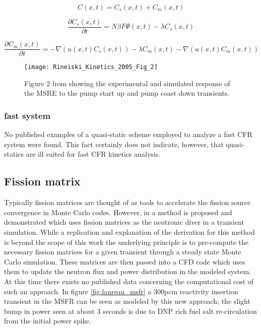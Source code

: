 \documentclass[review]{elsarticle}
\begin{document}
\begin{equation}
    \label{eq:spk_uni}
    C(x,t) = C_{s}(x,t) + C_{m}(x,t)
\end{equation}

\begin{equation}
    \label{eq:spk_static}
    \frac{\partial C_{s}(x,t)}{\partial t} = N \beta F \Psi(x,t) -
        \lambda C_{s}(x,t)
\end{equation}
 
\begin{equation}
    \label{eq:spk_move}
    \frac{\partial C_{m}(x,t)}{\partial t} = - \nabla (u(x,t) C_{s}(x,t)) -
        \lambda C_{m}(x,t) - \nabla(u(x,t) C_{m}(x,t))
\end{equation}

\begin{figure}[h]
   \centering
   \texttt{[image: Rineiski\_Kinetics\_2005\_Fig\_2]}
   \caption{Figure 2 from \cite{rineiski_kinetics_2005} showing the experimental and simulated
   response of the MSRE to the pump start up and pump coast down transients.} 
   \label{fig:rineiski_msre_ps}
\end{figure}

\subsubsection{fast system} \label{sssec:qs_fast}
No published examples of a quasi-static scheme employed to analyze a fast
CFR system were found. This fact certainly does not indicate, however, that
quasi-statics are ill suited for fast CFR kinetics analysis.

\subsection{Fission matrix}
Typically fission matrices are thought of as tools to accelerate the fission
source convergence in Monte Carlo codes. However, in 
\cite{laureau_coupled_2015} a method is proposed and demonstrated which uses
fission matrices as the neutronic diver in a transient simulation. While a
replication and explanation of the derivation for this method is beyond the
scope of this work the underlying principle is to pre-compute the necessary
fission matrices for a given transient through a steady state Monte Carlo
simulation. These matrices are then passed into a CFD code which uses them
to update the neutron flux and power distribution in the modeled system. At
this time there exists no published data concerning the computational cost
of such an approach. In figure \ref{fig:laureau_msfr} a 300pcm reactivity
insertion transient in the MSFR can be seen as modeled by this new approach; the
slight bump in power seen at about 3 seconds is due to DNP rich fuel salt
re-circulation from the initial power spike.
\end{document}

